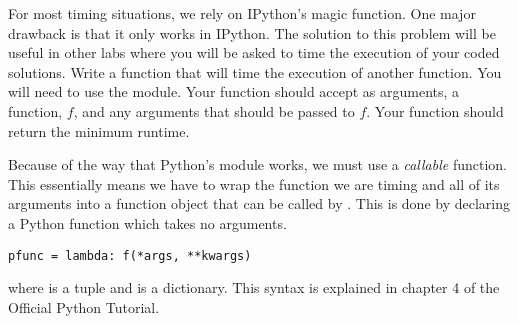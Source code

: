 \begin{enumerate}
\begin{problem}
For most timing situations, we rely on IPython's  magic function.
One major drawback is that it only works in IPython.
The solution to this problem will be useful in other labs where you will be asked to time the execution of your coded solutions.
Write a function that will time the execution of another function.
You will need to use the  module.
Your function should accept as arguments, a function, $f$, and any arguments that should be passed to $f$.
Your function should return the minimum runtime.

Because of the way that Python's  module works, we must use a \emph{callable} function.
This essentially means we have to wrap the function we are timing and all of its arguments into a function object that can be called by .
This is done by declaring a Python  function which takes no arguments.
\begin{lstlisting}
pfunc = lambda: f(*args, **kwargs)
\end{lstlisting}
where  is a tuple and  is a dictionary.
This syntax is explained in chapter 4 of the Official Python Tutorial.
\end{problem}




\end{enumerate}
